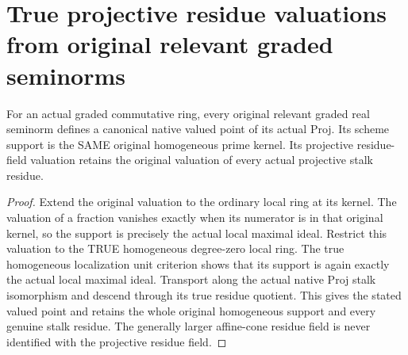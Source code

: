 \section{True projective residue valuations from original relevant graded seminorms}

\begin{theorem}
\label{thm:fc-graded-native-valued-point}
\leanok
{}
For an actual graded commutative ring, every original relevant graded
real seminorm defines a canonical native valued point of its actual
Proj. Its scheme support is the SAME original homogeneous prime kernel.
Its projective residue-field valuation retains the original valuation
of every actual projective stalk residue.
\end{theorem}
\begin{proof}
Extend the original valuation to the ordinary local ring at its kernel.
The valuation of a fraction vanishes exactly when its numerator is in
that original kernel, so the support is precisely the actual local
maximal ideal. Restrict this valuation to the TRUE homogeneous
degree-zero local ring. The true homogeneous localization unit criterion
shows that its support is again exactly the actual local maximal ideal.
Transport along the actual native Proj stalk isomorphism and descend
through its true residue quotient. This gives the stated valued point
and retains the whole original homogeneous support and every genuine
stalk residue. The generally larger affine-cone residue field is never
identified with the projective residue field.
\end{proof}

